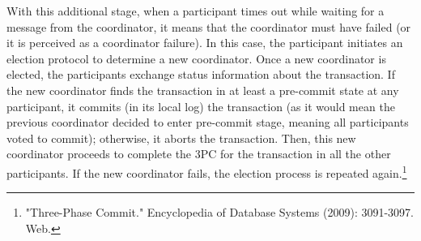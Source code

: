\documentclass[11pt]{article}
\begin{document}
\begin{enumerate}
	With this additional stage, when a participant times out while waiting for a message from the coordinator, it means that the coordinator must have failed (or it is perceived as a coordinator failure). In this case, the participant initiates an election protocol to determine a new coordinator. Once a new coordinator is elected, the participants exchange status information about the transaction. If the new coordinator finds the transaction in at least a pre-commit state at any participant, it commits (in its local log) the transaction (as it would mean the previous coordinator decided to enter pre-commit stage, meaning all participants voted to commit); otherwise, it aborts the transaction. Then, this new coordinator proceeds to complete the 3PC for the transaction in all the other participants. If the new coordinator fails, the election process is repeated again.\footnote{"Three-Phase Commit." Encyclopedia of Database Systems (2009): 3091-3097. Web.}

	
\end{enumerate}


\newpage
\end{document}
